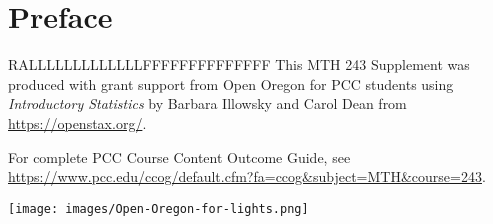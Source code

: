 \chapter{Preface}

RALLLLLLLLLLLLLFFFFFFFFFFFFFF
This MTH 243 Supplement was produced with grant support from 
Open Oregon 
for PCC students using 
\emph{Introductory Statistics} 
by Barbara Illowsky and Carol Dean
from
\url{https://openstax.org/}.

For complete PCC Course Content Outcome Guide, see \url{https://www.pcc.edu/ccog/default.cfm?fa=ccog&subject=MTH&course=243}.

\begin{center}
\texttt{[image: images/Open-Oregon-for-lights.png]}
\end{center}
